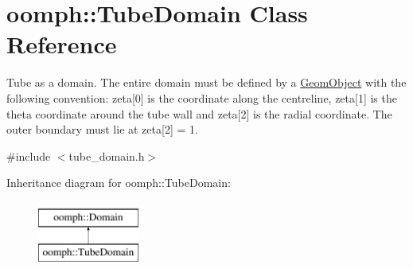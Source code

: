 \hypertarget{classoomph_1_1TubeDomain}{}\section{oomph\+:\+:Tube\+Domain Class Reference}
\label{classoomph_1_1TubeDomain}


Tube as a domain. The entire domain must be defined by a \hyperlink{classoomph_1_1GeomObject}{Geom\+Object} with the following convention\+: zeta\mbox{[}0\mbox{]} is the coordinate along the centreline, zeta\mbox{[}1\mbox{]} is the theta coordinate around the tube wall and zeta\mbox{[}2\mbox{]} is the radial coordinate. The outer boundary must lie at zeta\mbox{[}2\mbox{]} = 1.  




{\ttfamily \#include $<$tube\+\_\+domain.\+h$>$}

Inheritance diagram for oomph\+:\+:Tube\+Domain\+:\begin{figure}[H]
\begin{center}
\leavevmode
\includegraphics[height=2.000000cm]{classoomph_1_1TubeDomain}
\end{center}
\end{figure}
